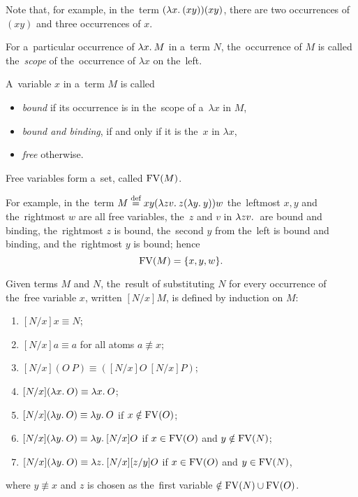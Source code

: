 Note that, for example, in the~term $(\lambda x . \: ( x y)) (x y)$, there are two
occurrences of $(x y)$ and three occurrences of $x$.

\begin{definition}
  For a~particular occurrence of $\lambda x . \: M$ in a~term $N$, the~occurrence of $M$
  is called the~\emph{scope} of the~occurrence of $\lambda x$ on the~left.
\end{definition}

\begin{definition}
  A~variable $x$ in a~term $M$ is called
  \begin{itemize}
    \item \emph{bound} if its occurrence is in the~scope of a~$\lambda x$ in
      $M$,
    \item \emph{bound and binding}, if and only if it is the~$x$ in $\lambda x$,
    \item \emph{free} otherwise.
  \end{itemize}
  Free variables form a~set, called $\mathrm{FV}(M)$.
\end{definition}

For example, in the~term $M \overset{\textrm{def}}{=} xy(\lambda zv . \: z (\lambda y . \: y))w$ the~leftmost
$x, y$ and the~rightmost $w$ are all free variables, the~$z$ and $v$ in
$\lambda zv . \: $ are bound and binding, the~rightmost $z$ is bound, the~second $y$
from the~left is bound and binding, and the~rightmost $y$ is bound;
hence
\[
  \mathrm{FV}(M) = \{x, y, w\} .
\]

\begin{definition}[Substitution]\label{def:substitution}
  Given terms $M$ and $N$, the~result of substituting $N$ for every occurrence
  of the~free variable $x$, written $[N/x]M$, is defined by induction on $M$:
  \begin{enumerate}
    \item $[N/x]x  \equiv N$;
    \item $[N/x]a  \equiv a$  \hfill for all atoms $a \not\equiv x$;
    \item $[N/x](O \: P)  \equiv ([N/x]O \: [N/x]P)$;
    \item $[N/x](\lambda x . \: O)  \equiv \lambda x . \: O$;
    \item $[N/x](\lambda y . \: O)  \equiv \lambda y . \: O$ \hfill if $x \notin \mathrm{FV}(O)$;
    \item $[N/x](\lambda y . \: O)  \equiv \lambda y . \: [N/x]O$
      \hfill if $x \in \mathrm{FV}(O)$ and $y \notin \mathrm{FV}(N)$;
    \item \label{def:substitution:g_item} $[N/x](\lambda y . \: O)
      \equiv \lambda z . \: [N/x][z/y]O$ \hfill if $x \in \mathrm{FV}(O)$ and $y \in \mathrm{FV}(N)$,
  \end{enumerate}
  where $y \not\equiv x$ and $z$ is chosen as the~first variable $\notin \mathrm{FV}(N)
  \cup \mathrm{FV}(O)$.
\end{definition}

